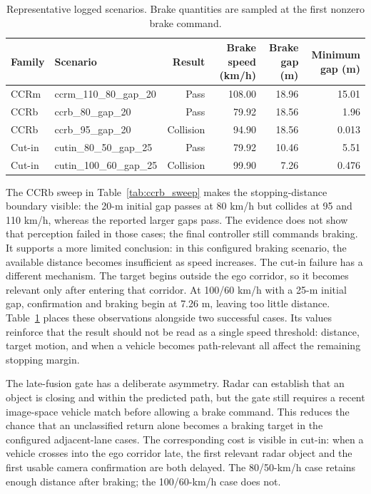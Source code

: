 \documentclass[conference]{IEEEtran}
\begin{document}
\begin{table}[t]
\caption{Representative logged scenarios. Brake quantities are sampled at the
first nonzero brake command.}
\label{tab:representative}
\centering
\footnotesize
\begin{tabular}{llrrrr}
\toprule
Family & Scenario & Result & Brake speed (km/h) & Brake gap (m) & Minimum gap (m) \\
\midrule
CCRm & ccrm\_110\_80\_gap\_20 & Pass & 108.00 & 18.96 & 15.01 \\
CCRb & ccrb\_80\_gap\_20 & Pass & 79.92 & 18.56 & 1.96 \\
CCRb & ccrb\_95\_gap\_20 & Collision & 94.90 & 18.56 & 0.013 \\
Cut-in & cutin\_80\_50\_gap\_25 & Pass & 79.92 & 10.46 & 5.51 \\
Cut-in & cutin\_100\_60\_gap\_25 & Collision & 99.90 & 7.26 & 0.476 \\
\bottomrule
\end{tabular}
\end{table}

The CCRb sweep in Table~\ref{tab:ccrb_sweep} makes the stopping-distance boundary
visible: the 20-m initial gap passes at 80 km/h but collides at 95 and 110 km/h,
whereas the reported larger gaps pass. The evidence does not show that perception
failed in those cases; the final controller still commands braking. It supports a
more limited conclusion: in this configured braking scenario, the available
distance becomes insufficient as speed increases. The cut-in failure has a
different mechanism. The target begins outside the ego corridor, so it becomes
relevant only after entering that corridor. At 100/60 km/h with a 25-m initial
gap, confirmation and braking begin at 7.26 m, leaving too little distance.
Table~\ref{tab:representative} places these observations alongside two successful
cases. Its values reinforce that the result should not be read as a single speed
threshold: distance, target motion, and when a vehicle becomes path-relevant all
affect the remaining stopping margin.

The late-fusion gate has a deliberate asymmetry. Radar can establish that an
object is closing and within the predicted path, but the gate still requires a
recent image-space vehicle match before allowing a brake command. This reduces
the chance that an unclassified return alone becomes a braking target in the
configured adjacent-lane cases. The corresponding cost is visible in cut-in:
when a vehicle crosses into the ego corridor late, the first relevant radar
object and the first usable camera confirmation are both delayed. The 80/50-km/h
case retains enough distance after braking; the 100/60-km/h case does not.
\end{document}

